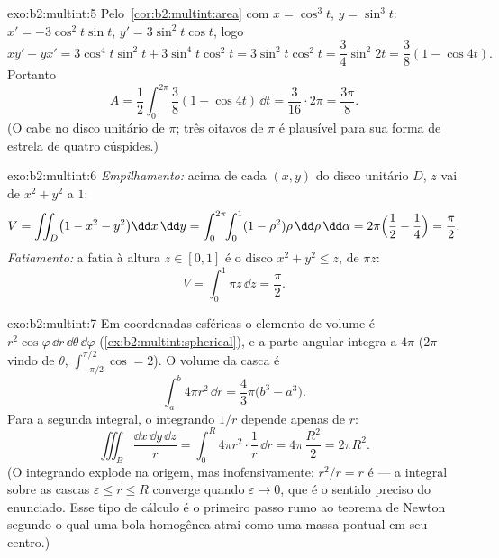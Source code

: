 \begin{solution}{exo:b2:multint:5}
Pelo~\cref{cor:b2:multint:area} com $x = \cos^3 t$, $y = \sin^3 t$:
$x' = -3\cos^2 t\sin t$, $y' = 3\sin^2 t\cos t$, logo
\[
xy' - yx' = 3\cos^4 t\sin^2 t + 3\sin^4 t\cos^2 t
= 3\sin^2 t\cos^2 t = \frac{3}{4}\sin^2 2t
= \frac{3}{8}(1 - \cos 4t) .
\]
Portanto
\[
A = \frac12\int_0^{2\pi}\frac38(1 - \cos 4t)\,\dd t
= \frac{3}{16}\cdot 2\pi = \frac{3\pi}{8} .
\]
(O  cabe no disco unitário de  $\pi$; três oitavos de
$\pi$ é plausível para sua forma de estrela de quatro cúspides.)
\end{solution}

\begin{solution}{exo:b2:multint:6}
\emph{Empilhamento:} acima de cada $(x, y)$ do disco unitário $D$, $z$
vai de $x^2 + y^2$ a $1$:
\[
V = \iint_D \bigl(1 - x^2 - y^2\bigr)\dd x\,\dd y
= \int_0^{2\pi}\!\!\int_0^1 (1 - \rho^2)\rho\,\dd\rho\,\dd\alpha
= 2\pi\Bigl(\frac12 - \frac14\Bigr) = \frac\pi2 .
\]
\emph{Fatiamento:} a fatia à altura $z \in [0, 1]$ é o disco
$x^2 + y^2 \leq z$, de  $\pi z$:
\[
V = \int_0^1 \pi z\,\dd z = \frac\pi2 .
\]
\end{solution}

\begin{solution}{exo:b2:multint:7}
Em coordenadas esféricas o elemento de volume é
$r^2\cos\varphi\,\dd r\,\dd\theta\,\dd\varphi$
(\cref{ex:b2:multint:spherical}), e a parte angular integra
a $4\pi$ ($2\pi$ vindo de $\theta$, $\int_{-\pi/2}^{\pi/2}\cos = 2$).
O volume da casca é
\[
\int_a^b 4\pi r^2\,\dd r = \frac43\pi\bigl(b^3 - a^3\bigr).
\]
Para a segunda integral, o integrando $1/r$ depende apenas de $r$:
\[
\iiint_B \frac{\dd x\,\dd y\,\dd z}{r}
= \int_0^R 4\pi r^2\cdot\frac1r\,\dd r
= 4\pi\,\frac{R^2}{2} = 2\pi R^2 .
\]
(O integrando explode na origem, mas inofensivamente: $r^2/r = r$
é  --- a integral sobre as cascas $\varepsilon \leq r
\leq R$ converge quando $\varepsilon \to 0$, que é o sentido preciso
do enunciado. Esse tipo de cálculo é o primeiro
passo rumo ao teorema de Newton segundo o qual uma bola homogênea atrai como
uma massa pontual em seu centro.)
\end{solution}

